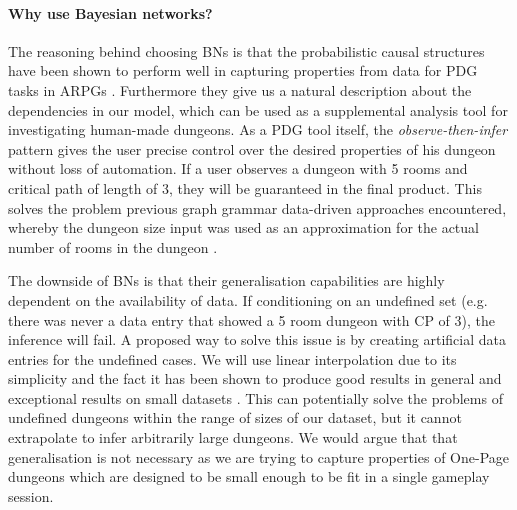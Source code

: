 \documentclass{UoYCSproject}
\begin{document}
\paragraph{Why use Bayesian networks?}
The reasoning behind choosing BNs is that the probabilistic causal structures have been shown to perform well in capturing properties from data for PDG tasks in ARPGs \parencite{SummervilleLearningOfZelda,SummervilleSamplingHyrule}. Furthermore they give us a natural description about the dependencies in our model, which can be used as a supplemental analysis tool for investigating human-made dungeons. As a PDG tool itself, the \textit{observe-then-infer} pattern gives the user precise control over the desired properties of his dungeon without loss of automation. If a user observes a dungeon with 5 rooms and critical path of length of 3, they will be guaranteed in the final product. This solves the problem previous graph grammar data-driven approaches encountered, whereby the dungeon size input was used as an approximation for the actual number of rooms in the dungeon \parencite{Deery}.

The downside of BNs is that their generalisation capabilities are highly dependent on the availability of data. If conditioning on an undefined set (e.g. there was never a data entry that showed a 5 room dungeon with CP of 3), the inference will fail. A proposed way to solve this issue is by creating artificial data entries for the undefined cases. We will use linear interpolation due to its simplicity and the fact it has been shown to produce good results in general \parencite{Ibargengoytia2013OnTE} and exceptional results on small datasets \parencite{yu2004advances}. This can potentially solve the problems of undefined dungeons within the range of sizes of our dataset, but it cannot extrapolate to infer arbitrarily large dungeons. We would argue that that generalisation is not necessary as we are trying to capture properties of One-Page dungeons which are designed to be small enough to be fit in a single gameplay session. 
\end{document}

